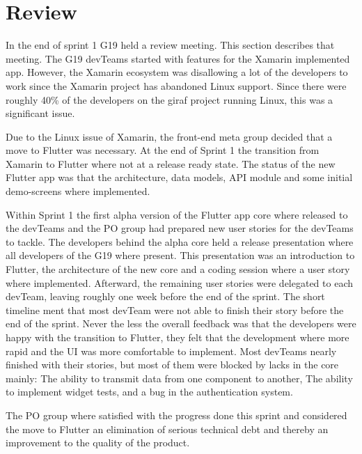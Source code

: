 \section{Review}
In the end of sprint 1 \gls{G19} held a review meeting. This section describes that meeting.
The \gls{G19} \glspl{devTeam} started with features for the Xamarin implemented app. However, the Xamarin ecosystem was disallowing a lot of the developers to work since the Xamarin project has abandoned Linux support. Since there were roughly 40\% of the developers on the \gls{giraf} project running Linux, this was a significant issue.

Due to the Linux issue of Xamarin, the front-end meta group decided that a move to Flutter was necessary. At the end of Sprint 1 the transition from Xamarin to Flutter where not at a release ready state. The status of the new Flutter app was that the architecture, data models, API module and some initial demo-screens where implemented.

Within Sprint 1 the first alpha version of the Flutter app core where released to the \glspl{devTeam} and the \gls{PO} group had prepared new user stories for the \glspl{devTeam} to tackle. The developers behind the alpha core held a release presentation where all developers of the \gls{G19} where present. This presentation was an introduction to Flutter, the architecture of the new core and a coding session where a user story where implemented. Afterward, the remaining user stories were delegated to each \gls{devTeam}, leaving roughly one week before the end of the sprint. The short timeline ment that most \gls{devTeam} were not  able to finish their story before the end of the sprint. Never the less the overall feedback was that the developers were happy with the transition to Flutter, they felt that the development where more rapid and the UI was more comfortable to implement. Most \glspl{devTeam} nearly finished with their stories, but most of them were blocked by lacks in the core mainly: The ability to transmit data from one component to another, The ability to implement widget tests, and a bug in the authentication system.

The \gls{PO} group where satisfied with the progress done this sprint and considered the move to Flutter an elimination of serious technical debt and thereby an improvement to the quality of the product.
